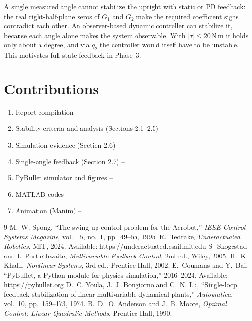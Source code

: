 \documentclass[12pt,a4paper]{article}
\newcommand{\Nm}{\,\mathrm{N\,m}}
\begin{document}
A single measured angle cannot stabilize the upright with static or PD feedback: the real right-half-plane zeros of $G_1$ and $G_2$ make the required coefficient signs contradict each other. An observer-based dynamic controller can stabilize it, because each angle alone makes the system observable. With $|\tau|\le20\Nm$ it holds only about a degree, and via $q_2$ the controller would itself have to be unstable. This motivates full-state feedback in Phase~3.

\section{Contributions}
\begin{enumerate}
\item Report compilation -- \underline{\hspace{4cm}}
\item Stability criteria and analysis (Sections 2.1--2.5) -- \underline{\hspace{4cm}}
\item Simulation evidence (Section 2.6) -- \underline{\hspace{4cm}}
\item Single-angle feedback (Section 2.7) -- \underline{\hspace{4cm}}
\item PyBullet simulator and figures -- \underline{\hspace{4cm}}
\item MATLAB codes -- \underline{\hspace{4cm}}
\item Animation (Manim) -- \underline{\hspace{4cm}}
\end{enumerate}

\begin{thebibliography}{9}
 M.~W. Spong, ``The swing up control problem for the Acrobot,'' \emph{IEEE Control Systems Magazine}, vol.~15, no.~1, pp.~49--55, 1995.
 R.~Tedrake, \emph{Underactuated Robotics}, MIT, 2024. Available: https://underactuated.csail.mit.edu
 S.~Skogestad and I.~Postlethwaite, \emph{Multivariable Feedback Control}, 2nd ed., Wiley, 2005.
 H.~K. Khalil, \emph{Nonlinear Systems}, 3rd ed., Prentice Hall, 2002.
 E.~Coumans and Y.~Bai, ``PyBullet, a Python module for physics simulation,'' 2016--2024. Available: https://pybullet.org
 D.~C. Youla, J.~J. Bongiorno and C.~N. Lu, ``Single-loop feedback-stabilization of linear multivariable dynamical plants,'' \emph{Automatica}, vol.~10, pp.~159--173, 1974.
 B.~D.~O. Anderson and J.~B. Moore, \emph{Optimal Control: Linear Quadratic Methods}, Prentice Hall, 1990.
\end{thebibliography}
\end{document}
